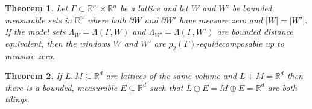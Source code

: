 \documentclass[10pt,a4paper]{amsart}
\newtheorem{theorem}{Theorem}
\newcommand{\RR}{{\mathbb R}}
\begin{document}
\begin{theorem}{\cite[Theorem 4.1]{EGKL2025}}\label{thm:equidecomp}
Let $\Gamma \subset \mathbb{R}^m \times \mathbb{R}^n$ be a lattice and let $W$ and $W'$ be bounded, measurable sets in $\mathbb{R}^n$ {where both $\partial W$ and $\partial W'$ have measure zero and $|W|=|W'|$}. If the model sets $\Lambda_W = \Lambda(\Gamma, W)$ and $\Lambda_{W'}=\Lambda(\Gamma, W')$ are bounded distance equivalent, then the windows $W$ and $W'$ are $p_2(\Gamma)$-equidecomposable up to measure zero.
\end{theorem}

\begin{theorem}\label{th:dense}
If $L, M \subseteq \RR^d$ are lattices of the same volume and $\overline{L+M}=\RR^d$ then there is a bounded, measurable $E \subseteq \RR^d$ such that $L \oplus E = M \oplus E = \RR^d$ are both tilings. 
\end{theorem}
\end{document}
